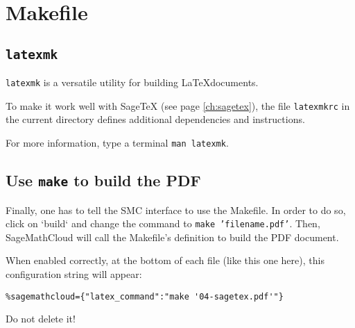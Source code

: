 \documentclass[master.tex]{subfiles}
\begin{document}
\chapter{Makefile}

\section{\texttt{latexmk}}

\texttt{latexmk} is a versatile utility for building \LaTeX documents.

To make it work well with SageTeX (see page \ref{ch:sagetex}),
the file \texttt{latexmkrc} in the current directory defines
additional dependencies and instructions.

For more information, type a terminal \texttt{man latexmk}.

\section{Use \texttt{make} to build the PDF}

Finally, one has to tell the SMC interface to use the Makefile.
In order to do so, click on `build` and change the
command to \texttt{make 'filename.pdf'}.
Then, SageMathCloud will call the Makefile's definition to build the PDF document.

When enabled correctly, at the bottom of each file (like this one here),
this configuration string will appear:

\begin{verbatim}
%sagemathcloud={"latex_command":"make '04-sagetex.pdf'"}
\end{verbatim}

Do not delete it!
\end{document}
